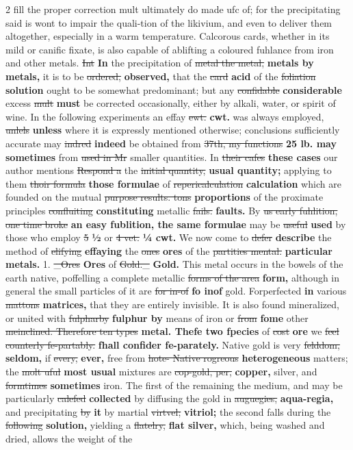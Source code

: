 \documentclass[10pt]{article}
\begin{document}
\begin{multicols}{2}
fill the proper correction mult ultimately do made ufc of; for the precipitating said is wont to impair the quali-tion of the likivium, and even to deliver them altogether, especially in a warm temperature. Calcorous cards, whether in its mild or canific fixate, is also capable of ablifting a coloured fuhlance from iron and other metals. \sout{Int} \textbf{In} the precipitation of \sout{metal the metal,} \textbf{metals by metals,} it is to be \sout{ordered,} \textbf{observed,} that the \sout{card} \textbf{acid} of the \sout{foliation} \textbf{solution} ought to be somewhat predominant; but any \sout{confidable} \textbf{considerable} excess \sout{mult} \textbf{must} be corrected occasionally, either by alkali, water, or spirit of wine. In the following experiments an effay \sout{ewt.} \textbf{cwt.} was always employed, \sout{unlels} \textbf{unless} where it is expressly mentioned otherwise; conclusions sufficiently accurate may \sout{indred} \textbf{indeed} be obtained from \sout{37th, my functions} \textbf{25 lb. may sometimes} from \sout{used in Mr} smaller quantities. In \sout{their cafes} \textbf{these cases} our author mentions \sout{Respond a} the \sout{initial quantity,} \textbf{usual quantity;} applying to them \sout{thoir formula} \textbf{those formulae} of \sout{repericalculation} \textbf{calculation} which are founded on the mutual \sout{purpose results. tons} \textbf{proportions} of the proximate principles \sout{confluiting} \textbf{constituting} metallic \sout{fails.} \textbf{faults.} By \sout{us early fuhlition, one time broke} \textbf{an easy fublition, the same formulae} may be \sout{useful} \textbf{used} by those who employ \sout{5} \textbf{½} or \sout{4 vet.} \textbf{¼ cwt.} We now come to \sout{defer} \textbf{describe} the method of \sout{elifying} \textbf{effaying} the \sout{ones} \textbf{ores} of the \sout{partities mental.} \textbf{particular metals.} 1. \sout{\_Ores} \textbf{Ores} of \sout{Gold.\_} \textbf{Gold.} This metal occurs in the bowels of the earth native, poffelling a complete metallic \sout{forms of the area} \textbf{form,} although in general the small particles of it are \sout{for in-of} \textbf{fo inof} gold. Forperfected \textbf{in} various \sout{mattons} \textbf{matrices,} that they are entirely invisible. It is also found mineralized, or united with \sout{fulpharby} \textbf{fulphur by} means of iron or \sout{from} \textbf{fome} other \sout{meinclined. Therefore ten types} \textbf{metal. Thefe two fpecies} of \sout{cost} \textbf{ore} we \sout{feel counterly fe-partably.} \textbf{fhall confider fe-parately.} Native gold is very \sout{felddom,} \textbf{seldom,} if \sout{every,} \textbf{ever,} free from \sout{hote- Native rogreous} \textbf{heterogeneous} matters; the \sout{molt uful} \textbf{most usual} mixtures are \sout{cop-gold, per,} \textbf{copper,} silver, and \sout{formtimes} \textbf{sometimes} iron. The first of the remaining the medium, and may be particularly \sout{calefed} \textbf{collected} by diffusing the gold in \sout{auguegies,} \textbf{aqua-regia,} and precipitating \sout{by} \textbf{it} by martial \sout{virtvel;} \textbf{vitriol;} the second falls during the \sout{following} \textbf{solution,} yielding a \sout{flatelry,} \textbf{flat silver,} which, being washed and dried, allows the weight of the 
\end{multicols}
\end{document}
